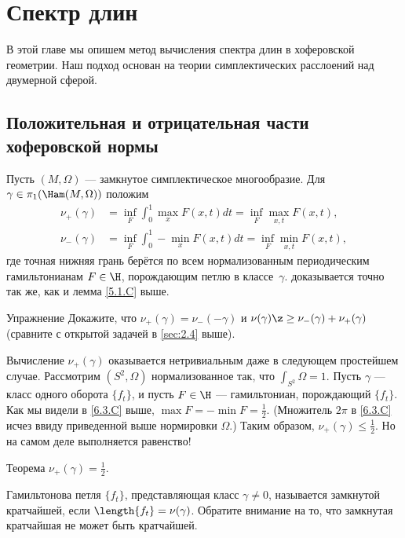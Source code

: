 \chapter{Спектр длин}

В этой главе мы опишем метод вычисления спектра длин в хоферовской геометрии.
Наш подход основан на теории симплектических расслоений над двумерной сферой.

\section{Положительная и отрицательная части хоферовской нормы}

Пусть $(M, \Omega)$ --- замкнутое симплектическое многообразие.
Для $\gamma \in \pi_1 (\Ham(M, \Omega))$ положим 
\begin{align*}
\nu_+ (\gamma) &= \inf_F \int_0^1 \max_x F (x, t)dt = \inf_F \max_{x,t}F (x, t),
\\ 
\nu_- (\gamma) &= \inf_F \int_0^1 -\min_x F (x, t)dt = \inf_F \min_{x,t}F (x, t),
\end{align*}
где точная нижняя грань берётся по всем нормализованным периодическим
гамильтонианам $F \in \H$, порождающим петлю в классе~$\gamma$. 
доказывается точно так же, как и лемма \ref{5.1.C} выше.

\begin{thm*}{Упражнение}
Докажите, что $\nu_+ (\gamma) = \nu_- (-\gamma)$ и $\nu(\gamma) \z\ge
\nu_- (\gamma) + \nu_+ (\gamma)$ 
(сравните с открытой задачей в \ref{sec:2.4} выше).
\end{thm*}

Вычисление $\nu_+ (\gamma)$ оказывается нетривиальным даже в следующем
простейшем случае. 
Рассмотрим $(S^2, \Omega)$ нормализованное так, что $\int_{S^2} \Omega = 1$.
Пусть $\gamma$ --- класс одного оборота $\{f_t\}$, и пусть $F \in \H$
--- гамильтониан, порождающий $\{f_t\}$. 
Как мы видели в \ref{6.3.C} выше,  $\max F = - \min F = \frac12$.
(Множитель $2\pi$ в \ref{6.3.C} исчез ввиду приведенной выше
нормировки $\Omega$.) 
Таким образом, $\nu_+ (\gamma) \le \frac12$.
Но на самом деле выполняется равенство!

\begin{thm}{Теорема}\label{9.1.A}
$\nu_+ (\gamma) = \frac12$.
\end{thm}

Гамильтонова петля $\{f_t \}$, представляющая класс $\gamma \ne 0$,
называется замкнутой кратчайшей, если $\length\{f_t \} =
\nu(\gamma)$.
Обратите внимание на то, что замкнутая кратчайшая не может быть
кратчайшей.

